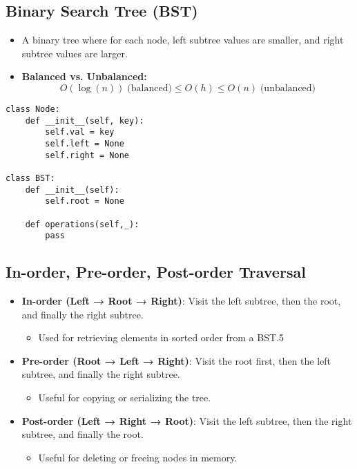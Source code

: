 \subsection{Binary Search Tree (BST)}
\begin{summary}
    \begin{itemize}
        \item A binary tree where for each node, left subtree values are smaller, and right subtree values are larger.
        \item \textbf{Balanced vs. Unbalanced:} 
            \begin{equation*}
                O(\log (n)) \; \text{(balanced)} \leq O(h) \leq O(n) \; \text{(unbalanced)}
            \end{equation*}
    \end{itemize}
\end{summary}

\begin{algo}
\begin{lstlisting}
class Node:
    def __init__(self, key):
        self.val = key
        self.left = None
        self.right = None

class BST:
    def __init__(self):
        self.root = None

    def operations(self,_):
        pass
\end{lstlisting}
\end{algo}

\subsection{In-order, Pre-order, Post-order Traversal}
\begin{definition}
    \begin{itemize}
        \item \textbf{In-order (Left → Root → Right)}: Visit the left subtree, then the root, and finally the right subtree.
        \begin{itemize}
            \item Used for retrieving elements in sorted order from a BST.5
        \end{itemize}
        \item \textbf{Pre-order (Root → Left → Right)}: Visit the root first, then the left subtree, and finally the right subtree.
        \begin{itemize}
            \item Useful for copying or serializing the tree.
        \end{itemize}
        \item \textbf{Post-order (Left → Right → Root)}: Visit the left subtree, then the right subtree, and finally the root.
        \begin{itemize}
            \item Useful for deleting or freeing nodes in memory.
        \end{itemize}
    \end{itemize}
\end{definition}

